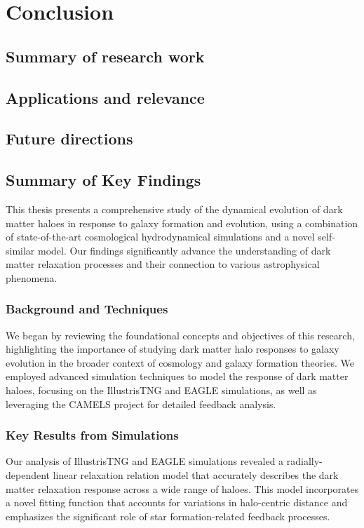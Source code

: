 \chapter{Conclusion}
\label{chap:conclusion}

\section{Summary of research work}

\section{Applications and relevance}

\section{Future directions}


\section*{Summary of Key Findings}

This thesis presents a comprehensive study of the dynamical evolution of dark matter haloes in response to galaxy formation and evolution, using a combination of state-of-the-art cosmological hydrodynamical simulations and a novel self-similar model. Our findings significantly advance the understanding of dark matter relaxation processes and their connection to various astrophysical phenomena.

\subsection*{Background and Techniques}
We began by reviewing the foundational concepts and objectives of this research, highlighting the importance of studying dark matter halo responses to galaxy evolution in the broader context of cosmology and galaxy formation theories. We employed advanced simulation techniques to model the response of dark matter haloes, focusing on the IllustrisTNG and EAGLE simulations, as well as leveraging the CAMELS project for detailed feedback analysis.

\subsection*{Key Results from Simulations}
Our analysis of IllustrisTNG and EAGLE simulations revealed a radially-dependent linear relaxation relation model that accurately describes the dark matter relaxation response across a wide range of haloes. This model incorporates a novel fitting function that accounts for variations in halo-centric distance and emphasizes the significant role of star formation-related feedback processes.

